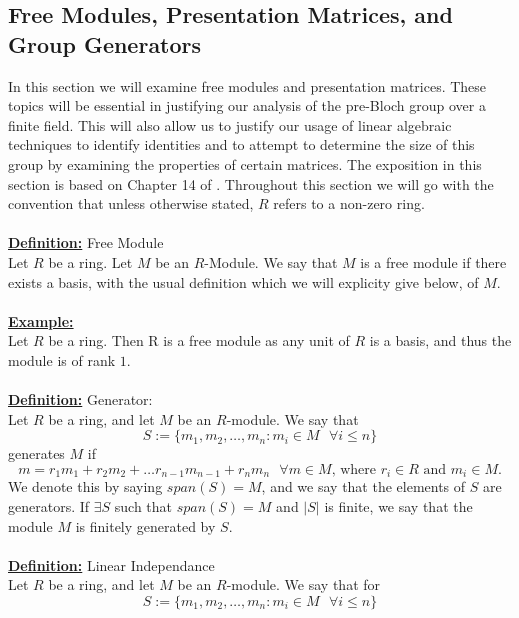 \documentclass[11pt]{article}
\theoremstyle{plain}
\theoremstyle{definition}
\begin{document}
\subsection{Free Modules, Presentation Matrices, and Group Generators}\label{section:Free Groups}
In this section we will examine free modules and presentation matrices. These topics will be essential in justifying our analysis of the pre-Bloch group over a finite field. This will also allow us to justify our usage of linear algebraic techniques to identify identities and to attempt to determine the size of this group by examining the properties of certain matrices. The exposition in this section is based on Chapter 14 of \cite{Algebra}. Throughout this section we will go with the convention that unless otherwise stated, $R$ refers to a non-zero ring. \\
\\
\textbf{\underline{Definition:}} Free Module \\
Let $R$ be a ring. Let $M$ be an $R$-Module. We say that $M$ is a free module if there exists a basis, with the usual definition which we will explicity give below, of $M$.\\
\\
\textbf{\underline{Example:}} \\
Let $R$ be a ring. Then R is a free module as any unit of $R$ is a basis, and thus the module is of rank $1$.\\
\\
\textbf{\underline{Definition:}} Generator: \\
Let $R$ be a ring, and let $M$ be an $R$-module. We say that
\begin{equation*}
S:=\{m_1, m_2, \ldots, m_n : m_i \in M\text{ } \forall i \leq n\}
\end{equation*}
generates $M$ if
\begin{equation*}
m=r_1 m_1 + r_2 m_2 + \ldots r_{n-1} m_{n-1} + r_n m_n \text{ } \forall m \in M \text{, where } r_i \in R \text{ and } m_i \in M.
\end{equation*}
We denote this by saying $span(S)=M$, and we say that the elements of $S$ are generators. If $\exists S$ such that $span(S)=M$ and $|S|$ is finite, we say that the module $M$ is finitely generated by $S$.\\
\\
\textbf{\underline{Definition:}} Linear Independance \\
Let $R$ be a ring, and let $M$ be an $R$-module. We say that for
\begin{equation*}
S:=\{m_1, m_2, \ldots, m_n : m_i \in M\text{ } \forall i \leq n\}
\end{equation*}
\end{document}

